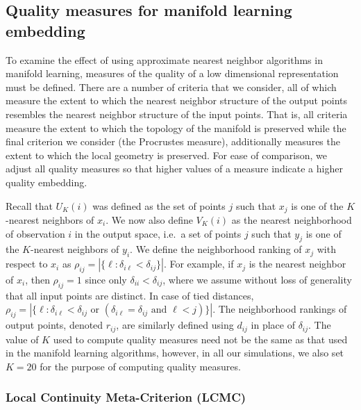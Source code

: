 \documentclass[11pt,a4paper,]{article}
\begin{document}
\hypertarget{qualitymeasure}{%
\subsection{Quality measures for manifold learning embedding}\label{qualitymeasure}}

To examine the effect of using approximate nearest neighbor algorithms in manifold learning, measures of the quality of a low dimensional representation must be defined. There are a number of criteria that we consider, all of which measure the extent to which the nearest neighbor structure of the output points resembles the nearest neighbor structure of the input points. That is, all criteria measure the extent to which the topology of the manifold is preserved while the final criterion we consider (the Procrustes measure), additionally measures the extent to which the local geometry is preserved. For ease of comparison, we adjust all quality measures so that higher values of a measure indicate a higher quality embedding.

Recall that \(U_K(i)\) was defined as the set of points \(j\) such that \(x_j\) is one of the \(K\)-nearest neighbors of \(x_i\). We now also define \(V_K(i)\) as the nearest neighborhood of observation \(i\) in the output space, i.e.~a set of points \(j\) such that \(y_j\) is one of the \(K\)-nearest neighbors of \(y_i\). We define the neighborhood ranking of \(x_j\) with respect to \(x_i\) as \(\rho_{ij} =|\{\ell: \delta_{i \ell}<\delta_{i j}\} |\). For example, if \(x_j\) is the nearest neighbor of \(x_i\), then \(\rho_{ij}=1\) since only \(\delta_{ii}<\delta_{ij}\), where we assume without loss of generality that all input points are distinct. In case of tied distances, \(\rho_{ij} =\left|\big\{\ell: \delta_{i \ell}<\delta_{i j} \text { or }(\delta_{i \ell}=\delta_{i j} \text { and } \ell<j)\big\}\right|\). The neighborhood rankings of output points, denoted \(r_{ij}\), are similarly defined using \(d_{ij}\) in place of \(\delta_{ij}\). The value of \(K\) used to compute quality measures need not be the same as that used in the manifold learning algorithms, however, in all our simulations, we also set \(K=20\) for the purpose of computing quality measures.

\hypertarget{local-continuity-meta-criterion-lcmc}{%
\subsubsection*{Local Continuity Meta-Criterion (LCMC)}\label{local-continuity-meta-criterion-lcmc}}
\end{document}
